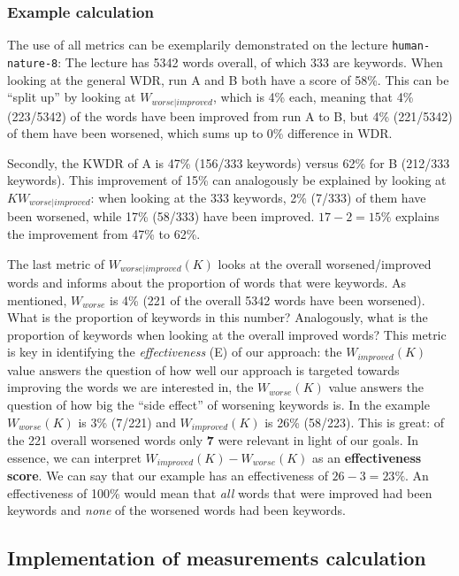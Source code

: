 \documentclass[]{article}
\begin{document}
\subsubsection{Example calculation}\label{example-calculation}

The use of all metrics can be exemplarily demonstrated on the lecture
\texttt{human-nature-8}: The lecture has 5342 words overall, of which
333 are keywords. When looking at the general WDR, run A and B both have
a score of 58\%. This can be ``split up'' by looking at
\(W_{worse|improved}\), which is 4\% each, meaning that 4\% (223/5342)
of the words have been improved from run A to B, but 4\% (221/5342) of
them have been worsened, which sums up to 0\% difference in WDR.

Secondly, the KWDR of A is 47\% (156/333 keywords) versus 62\% for B
(212/333 keywords). This improvement of 15\% can analogously be
explained by looking at \(KW_{worse|improved}\): when looking at the 333
keywords, 2\% (7/333) of them have been worsened, while 17\% (58/333)
have been improved. \(17-2 = 15\%\) explains the improvement from 47\%
to 62\%.

The last metric of \(W_{worse|improved}(K)\) looks at the overall
worsened/improved words and informs about the proportion of words that
were keywords. As mentioned, \(W_{worse}\) is 4\% (221 of the overall
5342 words have been worsened). What is the proportion of keywords in
this number? Analogously, what is the proportion of keywords when
looking at the overall improved words? This metric is key in identifying
the \emph{effectiveness} (E) of our approach: the \(W_{improved}(K)\)
value answers the question of how well our approach is targeted towards
improving the words we are interested in, the \(W_{worse}(K)\) value
answers the question of how big the ``side effect'' of worsening
keywords is. In the example \(W_{worse}(K)\) is 3\% (7/221) and
\(W_{improved}(K)\) is 26\% (58/223). This is great: of the 221 overall
worsened words only \textbf{7} were relevant in light of our goals. In
essence, we can interpret \(W_{improved}(K) - W_{worse}(K)\) as an
\textbf{effectiveness score}. We can say that our example has an
effectiveness of \(26-3=23\%\). An effectiveness of 100\% would mean
that \emph{all} words that were improved had been keywords and
\emph{none} of the worsened words had been keywords.

\subsection{Implementation of measurements
calculation}\label{implementation-of-measurements-calculation}
\end{document}
